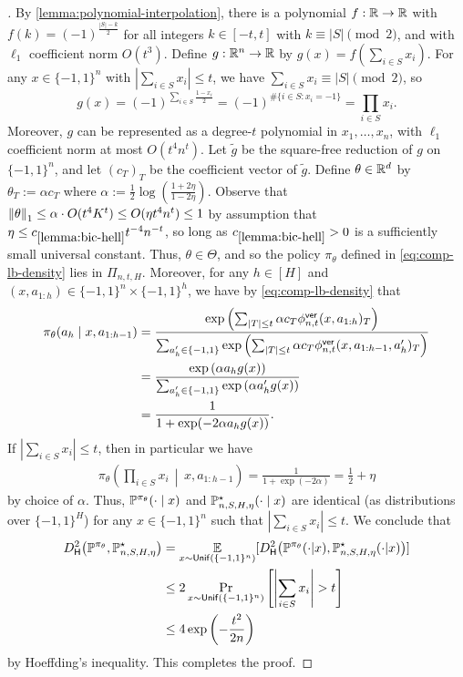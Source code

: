 \begin{proof}[]
By \cref{lemma:polynomial-interpolation}, there is a polynomial $f: \mathbb{R} \to \mathbb{R}$ with $f(k) = (-1)^{\frac{|S|-k}{2}}$ for all integers $k \in [-t,t]$ with $k \equiv |S| \pmod{2}$, and with $\ell_1$ coefficient norm $O(t^3)$. Define $g: \mathbb{R}^n \to \mathbb{R}$ by $g(x) = f(\sum_{i \in S} x_i)$. For any $x \in \{-1,1\}^n$ with $|\sum_{i \in S} x_i| \leq t$, we have $\sum_{i \in S} x_i \equiv |S| \pmod{2}$, so 
\[g(x) = (-1)^{\sum_{i \in S} \frac{1-x_i}{2}} = (-1)^{\#\{i \in S: x_i = -1\}} = \prod_{i \in S} x_i.\]
Moreover, $g$ can be represented as a degree-$t$ polynomial in $x_1,\dots,x_n$, with $\ell_1$ coefficient norm at most $O(t^4 n^t)$. Let $\tilde g$ be the square-free reduction of $g$ on $\{-1,1\}^n$, and let $(c_T)_T$ be the coefficient vector of $\tilde g$. Define $\theta \in \mathbb{R}^d$ by $\theta_T := \alpha c_T$ where $\alpha := \frac{1}{2}\log(\frac{1+2\eta}{1-2\eta})$. Observe that $\left \lVert \theta \right \rVert_1 \leq \alpha \cdot O(t^4 K^t) \leq O(\eta t^4 n^t) \leq 1$ by assumption that $\eta \leq c_{\ref{lemma:bic-hell}} t^{-4} n^{-t}$, so long as $c_{\ref{lemma:bic-hell}} > 0$ is a sufficiently small universal constant. Thus, $\theta \in \Theta$, and so the policy $\pi_\theta$ defined in \cref{eq:comp-lb-density} lies in $\Pi_{n,t,H}$. Moreover, for any $h \in [H]$ and $(x,a_{1:h}) \in \{-1,1\}^n \times \{-1,1\}^h$, we have by \eqref{eq:comp-lb-density} that
\begin{align}
\pi_\theta(a_h\mid{}x,a_{1:h-1})
&= \frac{\exp\left(\sum_{|T| \leq t} \alpha c_T \phi^{\mathsf{ver}}_{n,t}(x,a_{1:h})_T\right)}{\sum_{a'_h \in \{-1,1\}}\exp\left(\sum_{|T| \leq t} \alpha c_T \phi^{\mathsf{ver}}_{n,t}(x,a_{1:h-1},a'_h)_T\right)} \\
&= \frac{\exp\left(\alpha a_h g(x)\right)}{\sum_{a'_h \in \{-1,1\}}\exp\left(\alpha a'_h g(x)\right)} \\ 
&= \frac{1}{1 + \exp(-2\alpha a_h g(x))}.
\end{align}
If $|\sum_{i \in S} x_i| \leq t$, then in particular we have
\begin{align}
\pi_\theta\left(\prod_{i \in S} x_i \,\middle|\,x,a_{1:h-1}\right)
= \frac{1}{1 + \exp(-2\alpha)}
= \frac{1}{2} + \eta
\end{align}
by choice of $\alpha$. Thus, $\mathbb{P}^{\pi_\theta}(\cdot\mid{}x)$ and $\mathbb{P}^\star_{n,S,H,\eta}(\cdot\mid{}x)$ are identical (as distributions over $\{-1,1\}^H$) for any $x \in \{-1,1\}^n$ such that $|\sum_{i \in S} x_i| \leq t$. We conclude that
\begin{align}
\Dhels{\BP^{\pi_\theta}}{\BP^\st_{n,S,H,\eta}}
&= \EE_{x \sim \Unif(\{-1,1\}^n)} [\Dhels{\BP^{\pi_\theta}(\cdot|x)}{\BP^\st_{n,S,H,\eta}(\cdot|x)} ]\\ 
&\leq 2 \Prr_{x \sim \Unif(\{-1,1\}^n)}\left[\left|\sum_{i \in S} x_i\right| > t\right] \\ 
&\leq 4\exp\left(-\frac{t^2}{2n}\right)
\end{align}
by Hoeffding's inequality. This completes the proof.
\end{proof}

